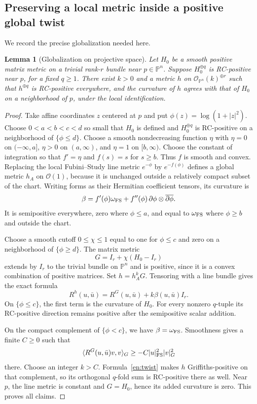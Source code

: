 \documentclass[12pt]{amsart}
\newtheorem{lem}[thm]{Lemma}
\theoremstyle{definition}
\theoremstyle{remark}
\numberwithin{equation}{section}
\theoremstyle{definition}
\begin{document}
\subsection{Preserving a local metric inside a positive global twist}
We record the precise globalization needed here.

\begin{lem}[Globalization on projective space]\label{en:glue}
Let $H_0$ be a smooth positive matrix metric on a trivial rank-$r$ bundle
near $p\in\mathbb P^n$. Suppose $H_0^{\oplus q}$ is RC-positive near
$p$, for a fixed $q\geq1$. There exist $k>0$ and a metric $h$ on
$\mathcal O_{\mathbb P^n}(k)^{\oplus r}$ such that
$h^{\oplus q}$ is RC-positive everywhere, and the curvature of $h$
agrees with that of $H_0$ on a neighborhood of $p$, under the local
identification.
\end{lem}
\begin{proof}
Take affine coordinates $z$ centered at $p$ and put
$\phi(z)=\log(1+|z|^2)$. Choose $0<a<b<c<d$ so small that $H_0$
is defined and $H_0^{\oplus q}$ is RC-positive on a neighborhood of
$\{\phi\leq d\}$.
Choose a smooth nondecreasing function $\eta$ with
$\eta=0$ on $(-\infty,a]$, $\eta>0$ on $(a,\infty)$, and
$\eta=1$ on $[b,\infty)$. Choose the constant of integration so that
$f'=\eta$ and $f(s)=s$ for $s\geq b$. Thus $f$ is smooth and convex.
Replacing the local Fubini--Study line metric $e^{-\phi}$ by
$e^{-f(\phi)}$ defines a global metric $h_A$ on $\mathcal O(1)$,
because it is unchanged outside a relatively compact subset of the chart.
Writing forms as their Hermitian coefficient tensors, its curvature is
\begin{equation}\label{en:flatten}
 \beta=f'(\phi)\omega_{\rm FS}
       +f''(\phi)\,\partial\phi\otimes\overline{\partial\phi}.
\end{equation}
It is semipositive everywhere, zero where $\phi\leq a$, and equal
to $\omega_{\rm FS}$ where $\phi\geq b$ and outside the chart.

Choose a smooth cutoff $0\leq\chi\leq1$ equal to one for $\phi\leq c$ and
zero on a neighborhood of $\{\phi\geq d\}$. The matrix metric
\[
 G=I_r+\chi(H_0-I_r)
\]
extends by $I_r$ to the trivial bundle on $\mathbb P^n$ and is positive,
since it is a convex combination of positive matrices.
Set $h=h_A^kG$. Tensoring with a line bundle gives the exact formula
\begin{equation}\label{en:twist}
 R^h(u,\bar u)=R^G(u,\bar u)+k\beta(u,\bar u)I_r.
\end{equation}
On $\{\phi\leq c\}$, the first term is the curvature of $H_0$.
For every nonzero $q$-tuple its RC-positive direction remains positive
after the semipositive scalar addition.

On the compact complement of $\{\phi<c\}$, we have
$\beta=\omega_{\rm FS}$. Smoothness gives a finite $C\geq0$ such that
\[
 \langle R^G(u,\bar u)v,v\rangle_G
 \geq-C|u|_{\rm FS}^2|v|_G^2
\]
there. Choose an integer $k>C$. Formula~\eqref{en:twist} makes $h$
Griffiths-positive on that complement, so its orthogonal $q$-fold sum
is RC-positive there as well. Near $p$, the line metric is constant
and $G=H_0$, hence its added curvature is zero. This proves all claims.
\end{proof}
\end{document}
